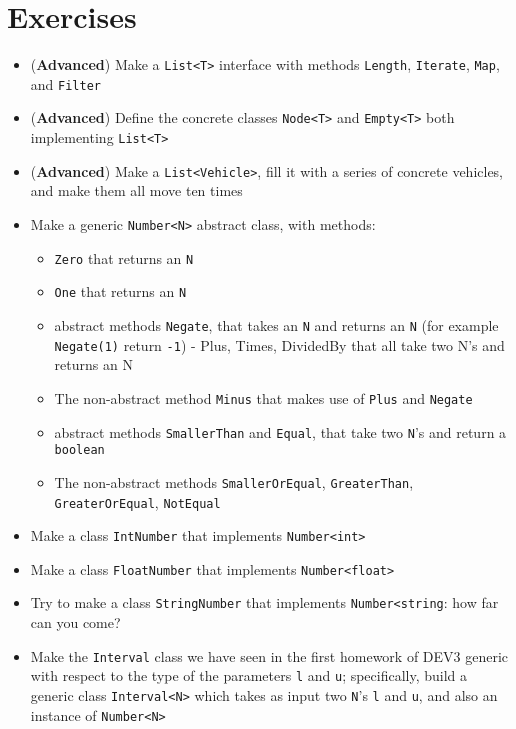     \section{Exercises}
        \begin{itemize}
            \item (\textbf{Advanced}) Make a \texttt{List<T>} interface with methods \texttt{Length}, \texttt{Iterate}, \texttt{Map}, and \texttt{Filter}
            \item (\textbf{Advanced}) Define the concrete classes \texttt{Node<T>} and \texttt{Empty<T>} both implementing \texttt{List<T>}
            \item (\textbf{Advanced}) Make a \texttt{List<Vehicle>}, fill it with a series of concrete vehicles, and make them all move ten times
            \item Make a generic \texttt{Number<N>} abstract class, with methods:
            \begin{itemize}
                \item \texttt{Zero} that returns an \texttt{N}
                \item \texttt{One} that returns an \texttt{N}
                \item abstract methods \texttt{Negate}, that takes an \texttt{N} and returns an \texttt{N} (for example \texttt{Negate(1)} return \texttt{-1})
                - Plus, Times, DividedBy that all take two N's and returns an N
                \item The non-abstract method \texttt{Minus} that makes use of \texttt{Plus} and \texttt{Negate}
                \item abstract methods \texttt{SmallerThan} and \texttt{Equal}, that take two \texttt{N}'s and return a \texttt{boolean}
                \item The non-abstract methods \texttt{SmallerOrEqual}, \texttt{GreaterThan}, \texttt{GreaterOrEqual}, \texttt{NotEqual}
            \end{itemize}

            \item Make a class \texttt{IntNumber} that implements \texttt{Number<int>}
            \item Make a class \texttt{FloatNumber} that implements \texttt{Number<float>}
            \item Try to make a class \texttt{StringNumber} that implements \texttt{Number<string}: how far can you come?

            \item Make the \texttt{Interval} class we have seen in the first homework of DEV3 generic with respect to the type of the parameters \texttt{l} and \texttt{u}; specifically, build a generic class \texttt{Interval<N>} which takes as input two \texttt{N}'s \texttt{l} and \texttt{u}, and also an instance of \texttt{Number<N>}
        \end{itemize}



